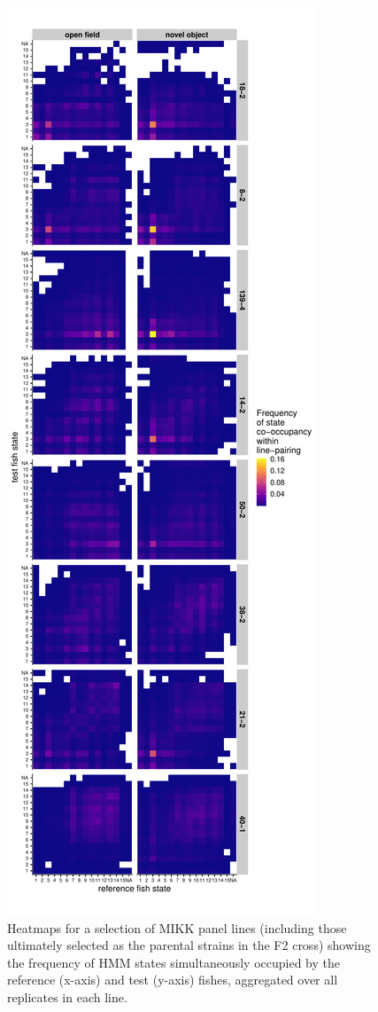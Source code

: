 \documentclass[
]{book}
\begin{document}
\begin{figure}
\includegraphics[width=1\linewidth]{figs/mikk_behaviour/0.08_15_cooc_heatmap} \caption{Heatmaps for a selection of MIKK panel lines (including those ultimately selected as the parental strains in the F2 cross) showing the frequency of HMM states simultaneously occupied by the reference (x-axis) and test (y-axis) fishes, aggregated over all replicates in each line.}\label{fig:F0-sge-cooc-heat}
\end{figure}
\end{document}
